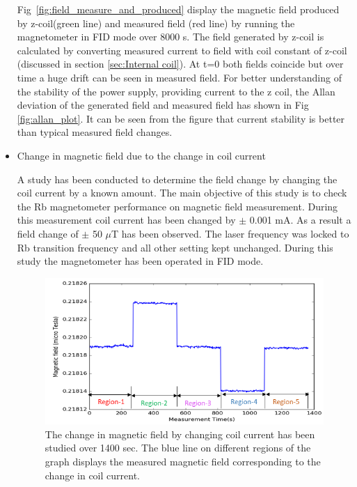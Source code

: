 \begin{itemize}
 Fig~\ref{fig:field_measure_and_produced} display the magnetic field produced by z-coil(green line) and measured field (red line) by running the magnetometer in FID mode over 8000 s. The field generated by z-coil is calculated by converting measured current to field with coil constant of z-coil (discussed in section \ref{sec:Internal coil}). At t=0 both fields coincide but over time a huge drift can be seen in measured field.  For better understanding of the stability of the power supply, providing current to the z coil, the Allan deviation of the generated field and measured field has shown in Fig \ref{fig:allan_plot}.  It can be seen from the figure that current stability is better than typical measured field changes.
  


   \item Change in magnetic field due to the change in coil current
   
 A study has been conducted to determine the field change by changing the coil current by a known amount. The main objective of this study is to check the Rb magnetometer performance on magnetic field measurement. During this measurement coil current has been changed by $\pm$ 0.001 mA. As a result a field change of $\pm$ 50  $\mu$T  has been observed. The laser frequency was locked to Rb transition frequency and all other setting kept unchanged. During this study the magnetometer has been operated in FID mode.
   \begin{figure}[h]
\centering\includegraphics[width=0.7\linewidth]{figures/field_change_with_current}
  
\caption{The change in magnetic field  by changing coil current has been studied over 1400 sec. The blue line on different regions of the graph displays the measured magnetic field corresponding to the change in coil current. \label{fig:field change}}
\end{figure} 
 

\end{itemize}
